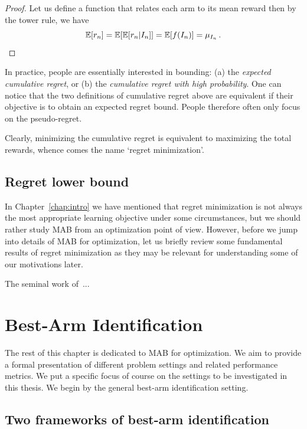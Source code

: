 \begin{proof}
	Let us define a function that relates each arm to its mean reward  then by the tower rule, we have
    \[
	    \mathbb{E}[r_n] = \mathbb{E}[\mathbb{E}[r_n|I_n]] = \mathbb{E}[f(I_n)] = \mu_{I_n}\,.
    \]
\end{proof}

In practice, people are essentially interested in bounding: (a) the \emph{expected cumulative regret}, or (b) the \emph{cumulative regret with high probability}. One can notice that the two definitions of cumulative regret above are equivalent if their objective is to obtain an expected regret bound. People therefore often only focus on the pseudo-regret.

Clearly, minimizing the cumulative regret is equivalent to maximizing the total rewards, whence comes the name `regret minimization'. 

\subsection{Regret lower bound}

In Chapter~\ref{chap:intro} we have mentioned that regret minimization is not always the most appropriate learning objective under some circumstances, but we should rather study MAB from an optimization point of view. However, before we jump into details of MAB for optimization, let us briefly review some fundamental results of regret minimization as they may be relevant for understanding some of our motivations later.

The seminal work of~\cite{robbins1952}...

\section{Best-Arm Identification}\label{sec:mab.bai}

The rest of this chapter is dedicated to MAB for optimization. We aim to provide a formal presentation of different problem settings and related performance metrics. We put a specific focus of course on the settings to be investigated in this thesis. We begin by the general best-arm identification setting.

\subsection{Two frameworks of best-arm identification}\label{sec:mab.bai.frameworks}

